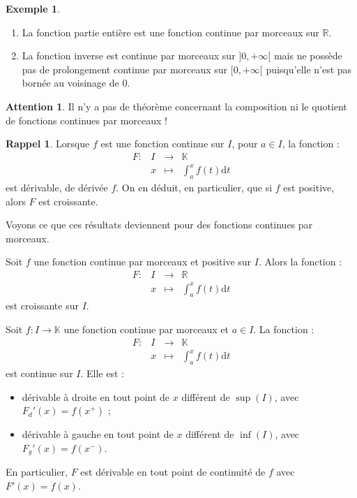 \documentclass[french]{article}
\newcommand{\R}{\mathbb{R}}
\newcommand{\K}{\mathbb{K}}
\renewcommand{\d}{\text{d}}
\theoremstyle{plain}
\theoremstyle{definition}
\newtheorem*{ex}{Exemple}
\newtheorem*{rappel}{Rappel}
\newtheorem*{attention}{Attention}
\theoremstyle{remark}
\begin{document}
\begin{ex}
	\begin{enumerate}
		\item La fonction partie entière est une fonction continue par morceaux sur $\R$.
		\item La fonction inverse est continue par morceaux sur $]0,+\infty[$ mais ne possède pas de prolongement continue par morceaux sur $[0,+\infty[$ puisqu'elle n'est pas bornée au voisinage de $0$.
	\end{enumerate}
\end{ex}

\begin{attention}
	Il n'y a pas de théorème concernant la composition ni le quotient de fonctions continues par morceaux !
\end{attention}

\begin{rappel}
	Lorsque $f$ est une fonction continue sur $I$, pour $a\in I$, la fonction : $$\begin{array}{lrcl}
	F:&I&\longrightarrow&\K\\
	&x&\longmapsto&\displaystyle\int_{a}^{x}f(t)\d t
\end{array}$$ est dérivable, de dérivée $f$. On en déduit, en particulier, que si $f$ est positive, alors $F$ est croissante.
\end{rappel}
Voyons ce que ces résultats deviennent pour des fonctions continues par morceaux.

\begin{prop}%
	Soit $f$ une fonction continue par morceaux et positive sur $I$. Alors la fonction :
	$$\begin{array}{lrcl}
		F:&I&\longrightarrow&\R\\
		&x&\longmapsto&\displaystyle\int_{a}^{x}f(t)\d t
	\end{array}$$
	est croissante sur $I$.
\end{prop}

\begin{prop}%
	Soit $f:I\to\K$ une fonction continue par morceaux et $a\in I$. La fonction :
	$$\begin{array}{lrcl}
		F:&I&\longrightarrow&\K\\
		&x&\longmapsto&\displaystyle\int_{a}^{x}f(t)\d t
	\end{array}$$
	est continue sur $I$. Elle est :
	\begin{itemize}
		\item dérivable à droite en tout point de $x$ différent de $\sup(I)$, avec $F_d'(x)=f(x^+)$ ;
		\item dérivable à gauche en tout point de $x$ différent de $\inf(I)$, avec $F_g'(x)=f(x^-)$.
	\end{itemize}
	En particulier, $F$ est dérivable en tout point de continuité de $f$ avec $F'(x)=f(x)$.
\end{prop}
\end{document}
